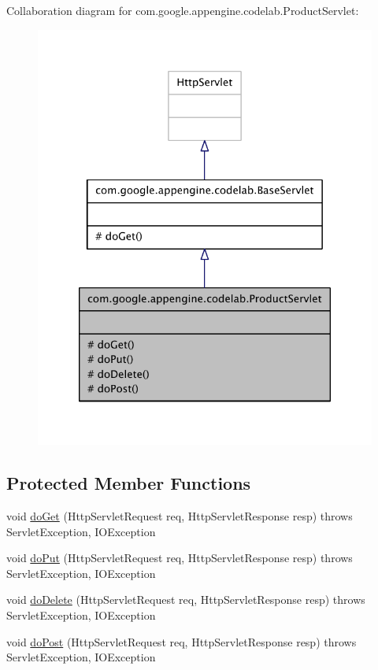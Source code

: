 Collaboration diagram for com.\-google.\-appengine.\-codelab.\-Product\-Servlet\-:
\nopagebreak
\begin{figure}[H]
\begin{center}
\leavevmode
\includegraphics[width=320pt]{classcom_1_1google_1_1appengine_1_1codelab_1_1_product_servlet__coll__graph}
\end{center}
\end{figure}
\subsection*{Protected Member Functions}
\begin{DoxyCompactItemize}
\item 
void \hyperlink{classcom_1_1google_1_1appengine_1_1codelab_1_1_product_servlet_a7c57929d447f8ee5c296d57be19d1727}{do\-Get} (Http\-Servlet\-Request req, Http\-Servlet\-Response resp)  throws Servlet\-Exception, I\-O\-Exception 
\item 
void \hyperlink{classcom_1_1google_1_1appengine_1_1codelab_1_1_product_servlet_a3cbc6cfe522686a474dade9a58b3d1a3}{do\-Put} (Http\-Servlet\-Request req, Http\-Servlet\-Response resp)  throws Servlet\-Exception, I\-O\-Exception 
\item 
void \hyperlink{classcom_1_1google_1_1appengine_1_1codelab_1_1_product_servlet_a772fa15f8adf07619e0e71e58488f198}{do\-Delete} (Http\-Servlet\-Request req, Http\-Servlet\-Response resp)  throws Servlet\-Exception, I\-O\-Exception 
\item 
void \hyperlink{classcom_1_1google_1_1appengine_1_1codelab_1_1_product_servlet_a851ac4b307d376fe7985f5ad46e07cf7}{do\-Post} (Http\-Servlet\-Request req, Http\-Servlet\-Response resp)  throws Servlet\-Exception, I\-O\-Exception 
\end{DoxyCompactItemize}


